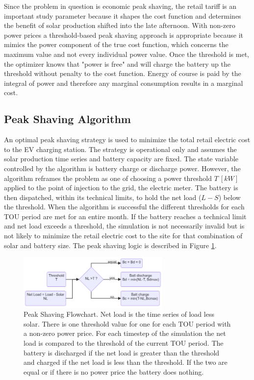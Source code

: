 \documentclass[journal,article,submit,pdftex,moreauthors]{Definitions/mdpi}
\begin{document}
Since the problem in question is economic peak shaving, the retail tariff is an important study parameter because it shapes the cost function and determines the benefit of solar production shifted into the late afternoon. With non-zero power prices a threshold-based peak shaving approach is appropriate because it mimics the power component of the true cost function, which concerns the maximum value and not every individual power value. Once the threshold is met, the optimizer knows that "power is free" and will charge the battery up the threshold without penalty to the cost function. Energy of course is paid by the integral of power and therefore any marginal consumption results in a marginal cost. 

\subsection{Peak Shaving Algorithm}\label{peak-shaving-algorithm}%

An optimal peak shaving strategy is used to minimize the total retail electric cost to the EV charging station. The strategy is operational only and assumes the solar production time series and battery capacity are fixed. The state variable controlled by the algorithm is battery charge or discharge power. However, the algorithm reframes the problem as one of choosing a power threshold \(T\ [kW]\) applied to the point of injection to the grid, the electric meter. The battery is then dispatched, within its technical limits, to hold the net load ($L-S$) below the threshold. When the algorithm is successful the different thresholds for each TOU period are met for an entire month. If the battery reaches a technical limit and net load exceeds a threshold, the simulation is not necessarily invalid but is not likely to minimize the retail electric cost to the site for that combination of solar and battery size. The peak shaving logic is described in Figure \ref{fig:peakshaving-flowchart}.

\begin{figure}
  \centering
  \includegraphics[width=7.5cm]{./images/peak shaving flowchart.png}
  \caption{Peak Shaving Flowchart. Net load is the time series of load less solar. There is one threshold value for one for each TOU period with a non-zero power price. For each timestep of the simulation the net load is compared to the threshold of the current TOU period. The battery is discharged if the net load is greater than the threshold and charged if the net load is less than the threshold. If the two are equal or if there is no power price the battery does nothing.}
  \label{fig:peakshaving-flowchart}
\end{figure}
\end{document}
